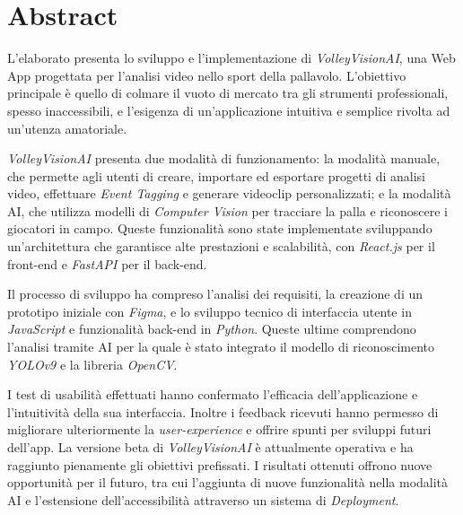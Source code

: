 \chapter*{Abstract}
\label{Abstract}

L'elaborato presenta lo sviluppo e l'implementazione di \textit{VolleyVisionAI}, una Web App progettata per l'analisi video nello sport della pallavolo. L'obiettivo principale è quello di colmare il vuoto di mercato tra gli strumenti professionali, spesso inaccessibili, e l'esigenza di un'applicazione intuitiva e semplice rivolta ad un'utenza amatoriale. 

\textit{VolleyVisionAI} presenta due modalità di funzionamento: la modalità manuale, che permette agli utenti di creare, importare ed esportare progetti di analisi video, effettuare \textit{Event Tagging} e generare videoclip personalizzati; e la modalità AI, che utilizza modelli di \textit{Computer Vision} per tracciare la palla e riconoscere i giocatori in campo. Queste funzionalità sono state implementate sviluppando un'architettura che garantisce alte prestazioni e scalabilità, con \textit{React.js} per il front-end e \textit{FastAPI} per il back-end.

Il processo di sviluppo ha compreso l'analisi dei requisiti, la creazione di un prototipo iniziale con \textit{Figma}, e lo sviluppo tecnico di interfaccia utente in \textit{JavaScript} e funzionalità back-end in \textit{Python}. Queste ultime comprendono l'analisi tramite AI per la quale è stato integrato il modello di riconoscimento \textit{YOLOv9} e la libreria \textit{OpenCV}. 

I test di usabilità effettuati hanno confermato l'efficacia dell'applicazione e l'intuitività della sua interfaccia. Inoltre i feedback ricevuti hanno permesso di migliorare ulteriormente la \textit{user-experience} e offrire spunti per sviluppi futuri dell'app. 
La versione beta di \textit{VolleyVisionAI} è attualmente operativa e ha raggiunto pienamente gli obiettivi prefissati. I risultati ottenuti offrono nuove opportunità per il futuro, tra cui l'aggiunta di nuove funzionalità nella modalità AI e l'estensione dell'accessibilità attraverso un sistema di \textit{Deployment}.
